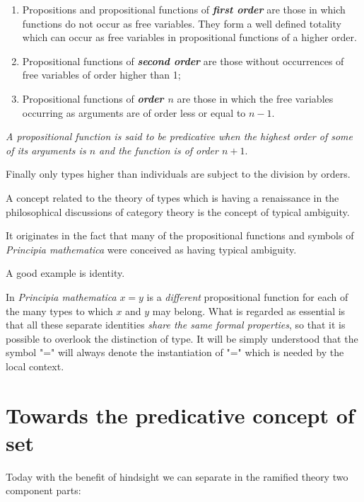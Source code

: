 \documentclass[12pt]{article}
\begin{document}
\begin{enumerate}

\item Propositions and propositional functions of \textbf{\emph{first order}} are those in which functions do not occur as free variables. They form a well defined totality which can occur as free variables in propositional functions of a higher order.

\item Propositional functions of \textbf{\emph{second order}} are those without occurrences of free variables of order higher than 1;

\item Propositional functions of \textbf{\emph{order $n$}} are those in which the free variables occurring as arguments are of order less or equal to $n-1.$
\end{enumerate}

\emph{A propositional function is said to be predicative when the highest order of some of its arguments is $n$ and the function is of order $n+1.$}

Finally only types higher than individuals are subject to the division by orders.

A concept related to the theory of types which is having a renaissance in the philosophical discussions of category theory is the concept of typical ambiguity.

It originates in the fact that many of the propositional functions and symbols of \emph{Principia mathematica} were conceived as having typical ambiguity.

A good example is identity.

In \emph{Principia mathematica} $x = y$ is a \emph{different} propositional function for each of the many types to which $x$ and $y$ may belong. What is regarded as essential is that all these separate identities \emph{share the same formal properties}, so that it is possible to overlook the distinction of type. It will be simply  understood that the symbol "=" will always denote the instantiation of "=" which is needed by the local context.

\section{Towards the predicative concept of set}\normalsize

Today with the benefit of hindsight we can separate in the ramified theory two component parts:
\end{document}
